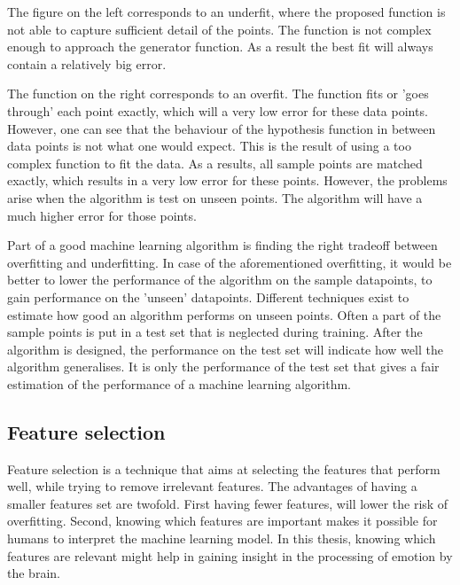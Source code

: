 
\npar

The figure on the left corresponds to an underfit, where the proposed function is not able to capture sufficient detail of the points. The function is not complex enough to approach the generator function. As a result the best fit will always contain a relatively big error.

\npar

The function on the right corresponds to an overfit. The function fits or 'goes through' each point exactly, which will a very low error for these data points. However, one can see that the behaviour of the hypothesis function in between data points is not what one would expect. This is the result of using a too complex function to fit the data. As a results, all sample points are matched exactly, which results in a very low error for these points. However, the problems arise when the algorithm is test on unseen points. The algorithm will have a much higher error for those points. 

\npar 

Part of a good machine learning algorithm is finding the right tradeoff between overfitting and underfitting. In case of the aforementioned overfitting, it would be better to lower the performance of the algorithm on the sample datapoints, to gain performance on the 'unseen' datapoints. Different techniques exist to estimate how good an algorithm performs on unseen points. Often a part of the sample points is put in a test set that is neglected during training. After the algorithm is designed, the performance on the test set will indicate how well the algorithm generalises. It is only the performance of the test set that gives a fair estimation of the performance of a machine learning algorithm.

\subsection{Feature selection}
Feature selection is a technique that aims at selecting the features that perform well, while trying to remove irrelevant features\citep{rfPaper}. The advantages of having a smaller features set are twofold. First having fewer features, will lower the risk of overfitting\citep{rfPaper}. Second, knowing which features are important makes it possible for humans to interpret the machine learning model. In this thesis, knowing which features are relevant might help in gaining insight in the processing of emotion by the brain. 

